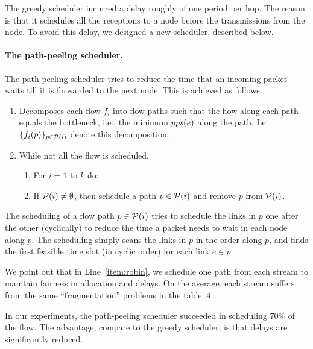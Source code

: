 \documentclass[12pt]{article}
\newenvironment{proof sketch}[1]{\noindent {\emph{Proof sketch of #1:}}}{\hfill \qed}
\newcommand{\pps}{\text{\emph{pps}}}
\begin{document}
 The greedy scheduler incurred a delay roughly of
  one period per hop. The reason is that it schedules all the
  receptions to a node before the transmissions from the node. To
  avoid this delay, we designed a new scheduler, described below.

\paragraph{The path-peeling scheduler.}
The path peeling scheduler tries to reduce the time that an incoming
packet waits till it is forwarded to the next node. This is achieved
as follows.
\begin{enumerate}
\item Decomposes each flow $f_i$ into flow paths such that the flow
  along each path equals the bottleneck, i.e., the minimum $\pps(e)$ along the path.  Let
  $\{f_i(p)\}_{p\in {\cal{P}}(i)}$ denote this decomposition.
\item While not all the flow is scheduled,
  \begin{enumerate}
  \item \label{item:robin} For $i=1$ to $k$ do:
  \item If ${\cal P}(i)\neq \emptyset$, then schedule a path $p\in {\cal P}(i)$ and remove $p$ from ${\cal P}(i)$.
  \end{enumerate}
\end{enumerate}
The scheduling of a flow path $p\in {\cal P}(i)$ tries to schedule the links in
$p$ one after the other (cyclically) to reduce the time a packet needs to wait in each node
along $p$. The scheduling simply scans the links in $p$ in the order
along $p$, and finds the first feasible time slot (in cyclic order) for
each link $e\in p$.

We point out that in Line~\ref{item:robin}, we schedule one path from
each stream to maintain fairness in allocation and delays. On the average, each stream
suffers from the same ``fragmentation'' problems in the table $A$.

In our experiments, the path-peeling scheduler succeeded in scheduling
70\% of the flow. The advantage, compare to the greedy
scheduler, is that delays are significantly reduced.
\end{document}
